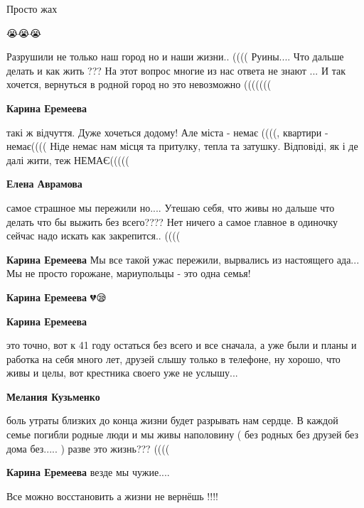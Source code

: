 
Просто жах


😭😭😭


Разрушили не только наш город но и наши жизни.. (((( Руины.... Что дальше
делать и как жить ??? На этот вопрос многие из нас ответа не знают ... И так
хочется, вернуться в родной город но это невозможно (((((((

\begin{itemize} %
\textbf{Карина Еремеева} 

такі ж відчуття. Дуже хочеться додому! Але міста - немає ((((, квартири -
немає(((( Ніде немає нам місця та притулку, тепла та затушку. Відповіді, як і
де далі жити, теж НЕМАЄ(((((

\begin{itemize} %
\textbf{Елена Аврамова} 

самое страшное мы пережили но.... Утешаю себя, что живы но дальше что делать
что бы выжить без всего???? Нет ничего а самое главное в одиночку сейчас надо
искать как закрепится.. ((((

\textbf{Карина Еремеева} Мы все такой ужас пережили, вырвались из настоящего ада... Мы не просто горожане, мариупольцы - это одна семья!
\end{itemize} %

\textbf{Карина Еремеева} 💔😪

\textbf{Карина Еремеева} 

это точно, вот к 41 году остаться без всего и все сначала, а уже были и планы и
работка на себя много лет, друзей слышу только в телефоне, ну хорошо, что живы и
целы, вот крестника своего уже не услышу...

\textbf{Мелания Кузьменко} 

боль утраты близких до конца жизни будет разрывать нам сердце. В каждой семье
погибли родные люди и мы живы наполовину ( без родных без друзей без дома
без..... ) разве это жизнь??? ((((

\textbf{Карина Еремеева} везде мы чужие....


Все можно восстановить а жизни не вернёшь !!!!

\end{itemize} %

